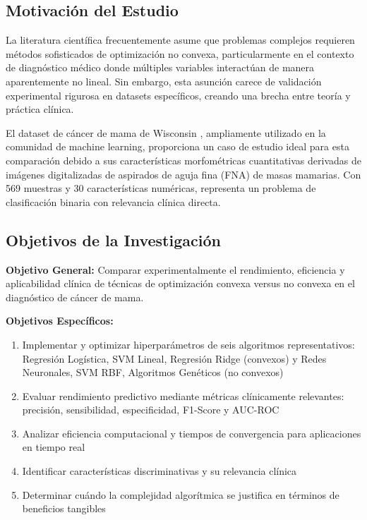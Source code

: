 \documentclass[12pt,a4paper]{article}
\begin{document}
\subsection{Motivación del Estudio}

La literatura científica frecuentemente asume que problemas complejos requieren métodos sofisticados de optimización no convexa, particularmente en el contexto de diagnóstico médico donde múltiples variables interactúan de manera aparentemente no lineal. Sin embargo, esta asunción carece de validación experimental rigurosa en datasets específicos, creando una brecha entre teoría y práctica clínica.

El dataset de cáncer de mama de Wisconsin \cite{wolberg1995}, ampliamente utilizado en la comunidad de machine learning, proporciona un caso de estudio ideal para esta comparación debido a sus características morfométricas cuantitativas derivadas de imágenes digitalizadas de aspirados de aguja fina (FNA) de masas mamarias. Con 569 muestras y 30 características numéricas, representa un problema de clasificación binaria con relevancia clínica directa.

\subsection{Objetivos de la Investigación}

\textbf{Objetivo General:}
Comparar experimentalmente el rendimiento, eficiencia y aplicabilidad clínica de técnicas de optimización convexa versus no convexa en el diagnóstico de cáncer de mama.

\textbf{Objetivos Específicos:}
\begin{enumerate}
    \item Implementar y optimizar hiperparámetros de seis algoritmos representativos: Regresión Logística, SVM Lineal, Regresión Ridge (convexos) y Redes Neuronales, SVM RBF, Algoritmos Genéticos (no convexos)
    \item Evaluar rendimiento predictivo mediante métricas clínicamente relevantes: precisión, sensibilidad, especificidad, F1-Score y AUC-ROC
    \item Analizar eficiencia computacional y tiempos de convergencia para aplicaciones en tiempo real
    \item Identificar características discriminativas y su relevancia clínica
    \item Determinar cuándo la complejidad algorítmica se justifica en términos de beneficios tangibles
\end{enumerate}
\end{document}
